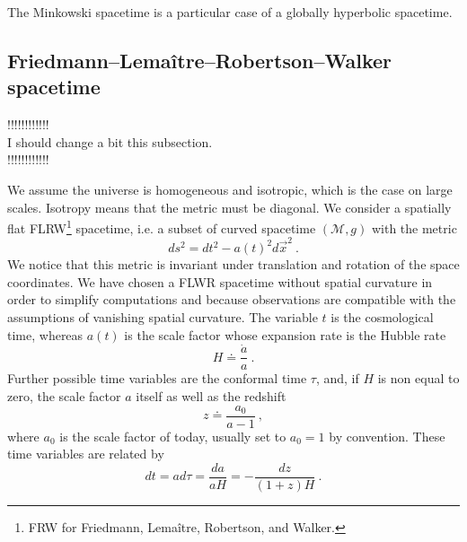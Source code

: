 \documentclass[12pt]{book}
\newcommand{\Mcal}{\mathcal{M}}
\theoremstyle{break}
\begin{document}
The Minkowski spacetime is a particular case of a globally hyperbolic spacetime. 


\subsection{Friedmann--Lemaître--Robertson--Walker spacetime}

!!!!!!!!!!!!\\
I should change a bit this subsection.\\
!!!!!!!!!!!!



We assume the universe is homogeneous and isotropic, which is the case on large scales. Isotropy means that the metric must be diagonal. We consider a spatially flat FLRW\footnote{FRW for Friedmann, Lemaître, Robertson, and Walker.} spacetime, i.e. a subset of curved spacetime $(\Mcal,g)$ with the metric
%
\begin{equation*}
ds^2 = dt^2 - a(t)^2 d\vec{x}^2 \ .
\end{equation*}
%
We notice that this metric is invariant under translation and rotation of the space coordinates. We have chosen a FLWR spacetime without spatial curvature in order to simplify computations and because observations are compatible with the assumptions of vanishing spatial curvature. The variable $t$ is the cosmological time, whereas $a(t)$ is the scale factor whose expansion rate is the Hubble rate
%
\begin{equation*}
 H \doteq \frac{\dot{a}}{a} \ . 
\end{equation*}
%
Further possible time variables are the conformal time $\tau$, and, if $H$ is non equal to zero, the scale factor $a$ itself as well as the redshift
%
\begin{equation*}
z \doteq \frac{a_0}{a-1} \ ,
\end{equation*}
%
where $a_0$ is the scale factor of today, usually set to $a_0 = 1$ by convention. These time variables are related by
%
\begin{equation*}
dt = a d\tau = \frac{da}{aH} = -\frac{dz}{(1+z)H} \ . 
\end{equation*}


\vfill
\end{document}

